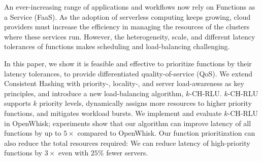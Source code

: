 
%
%


%
%
An ever-increasing range of applications and workflows now rely on Functions as a Service (FaaS).
As the adoption of serverless computing keeps growing, cloud providers must increase the efficiency in managing the resources of the clusters where these services run.
However, the heterogeneity, scale, and different latency tolerances of functions makes scheduling and load-balancing challenging. 

In this paper, we show it is feasible and effective to prioritize functions by their latency tolerances, to provide differentiated quality-of-service (QoS).
We extend Consistent Hashing with priority-, locality-, and server load-awareness as key principles, and introduce a new load-balancing algorithm, $k$-CH-RLU.
$k$-CH-RLU supports $k$ priority levels, dynamically assigns more resources to higher priority functions, and mitigates workload bursts. 
We implement and evaluate $k$-CH-RLU in OpenWhisk;
experiments show that our algorithm can improve latency of all functions by up to $5\times$ compared to OpenWhisk.
Our function prioritization can also reduce the total resources required:
We can reduce latency of high-priority functions by $3\times$ even with $25\%$ fewer servers. 

